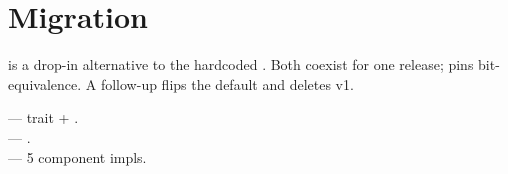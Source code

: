 \section{Migration}

 is a drop-in alternative to
the hardcoded . Both coexist for one release;
 pins
bit-equivalence. A follow-up flips the default and deletes v1.

\begin{inthecode}
 --- trait +
.\\
 ---
.\\
 --- 5
component impls.
\end{inthecode}
